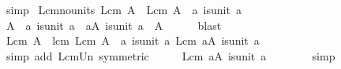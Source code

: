 \begin{isabellebody}
\ simp\isanewline
{}\isamarkupfalse%
%
\endisatagproof
{\isafoldproof}%
%
\isadelimproof
\isanewline
%
\endisadelimproof
\isanewline
{}\isamarkupfalse%
\ Lcm{\isacharunderscore}{\kern0pt}no{\isacharunderscore}{\kern0pt}units{\isacharcolon}{\kern0pt}\ {\isachardoublequoteopen}Lcm\ A\ {\isacharequal}{\kern0pt}\ Lcm\ {\isacharparenleft}{\kern0pt}A\ {\isacharminus}{\kern0pt}\ {\isacharbraceleft}{\kern0pt}a{\isachardot}{\kern0pt}\ is{\isacharunderscore}{\kern0pt}unit\ a{\isacharbraceright}{\kern0pt}{\isacharparenright}{\kern0pt}{\isachardoublequoteclose}\isanewline
%
\isadelimproof
%
\endisadelimproof
%
\isatagproof
{}\isamarkupfalse%
\ {\isacharminus}{\kern0pt}\isanewline
\ \ \isamarkupfalse%
\ {\isachardoublequoteopen}{\isacharparenleft}{\kern0pt}A\ {\isacharminus}{\kern0pt}\ {\isacharbraceleft}{\kern0pt}a{\isachardot}{\kern0pt}\ is{\isacharunderscore}{\kern0pt}unit\ a{\isacharbraceright}{\kern0pt}{\isacharparenright}{\kern0pt}\ {\isasymunion}\ {\isacharbraceleft}{\kern0pt}a{\isasymin}A{\isachardot}{\kern0pt}\ is{\isacharunderscore}{\kern0pt}unit\ a{\isacharbraceright}{\kern0pt}\ {\isacharequal}{\kern0pt}\ A{\isachardoublequoteclose}\isanewline
\ \ \ \ \isamarkupfalse%
\ blast\isanewline
\ \ \isamarkupfalse%
\ \isamarkupfalse%
\ {\isachardoublequoteopen}Lcm\ A\ {\isacharequal}{\kern0pt}\ lcm\ {\isacharparenleft}{\kern0pt}Lcm\ {\isacharparenleft}{\kern0pt}A\ {\isacharminus}{\kern0pt}\ {\isacharbraceleft}{\kern0pt}a{\isachardot}{\kern0pt}\ is{\isacharunderscore}{\kern0pt}unit\ a{\isacharbraceright}{\kern0pt}{\isacharparenright}{\kern0pt}{\isacharparenright}{\kern0pt}\ {\isacharparenleft}{\kern0pt}Lcm\ {\isacharbraceleft}{\kern0pt}a{\isasymin}A{\isachardot}{\kern0pt}\ is{\isacharunderscore}{\kern0pt}unit\ a{\isacharbraceright}{\kern0pt}{\isacharparenright}{\kern0pt}{\isachardoublequoteclose}\isanewline
\ \ \ \ \isamarkupfalse%
\ {\isacharparenleft}{\kern0pt}simp\ add{\isacharcolon}{\kern0pt}\ Lcm{\isacharunderscore}{\kern0pt}Un\ {\isacharbrackleft}{\kern0pt}symmetric{\isacharbrackright}{\kern0pt}{\isacharparenright}{\kern0pt}\isanewline
\ \ \isamarkupfalse%
\ \isamarkupfalse%
\ {\isachardoublequoteopen}Lcm\ {\isacharbraceleft}{\kern0pt}a{\isasymin}A{\isachardot}{\kern0pt}\ is{\isacharunderscore}{\kern0pt}unit\ a{\isacharbraceright}{\kern0pt}\ {\isacharequal}{\kern0pt}\ {}{\isachardoublequoteclose}\isanewline
\ \ \ \ \isamarkupfalse%
\ simp\isanewline
\ \ \isamarkupfalse%

\end{isabellebody}
